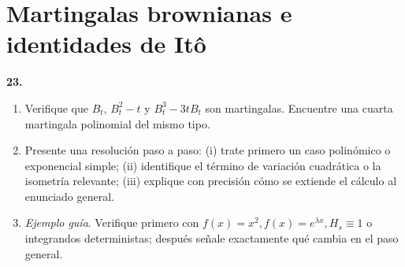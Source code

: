 \documentclass[11pt, letterpaper]{article}
\begin{document}
\newpage
\section{Martingalas brownianas e identidades de Itô}

\begin{ejercicio}
    \textbf{23.} 
    \begin{enumerate}
        \item Verifique que $B_t$, $B_t^2 - t$ y $B_t^3 - 3tB_t$ son martingalas. Encuentre una cuarta martingala polinomial del mismo tipo.
        \item Presente una resolución paso a paso: (i) trate primero un caso polinómico o exponencial simple; (ii) identifique el término de variación cuadrática o la isometría relevante; (iii) explique con precisión cómo se extiende el cálculo al enunciado general.
        \item \textit{Ejemplo guía}. Verifique primero con $f(x) = x^2, f(x) = e^{\lambda x}, H_s \equiv 1$ o integrandos deterministas; después señale exactamente qué cambia en el paso general.
    \end{enumerate}
\end{ejercicio}

\vspace{5mm}
\end{document}
